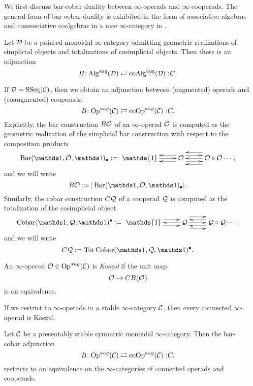 We first discuss bar-cobar duality between $\infty$-operads and $\infty$-cooperads. The general form of bar-cobar duality is exhibited in the form of associative algebras and coassociative coalgebras in a nice $\infty$-category in \cite{HA}.
\begin{proposition}
\cite[Remark 5.2.2.19.]{HA}
Let ${\mathcal{D}}$ be a pointed monoidal $\infty$-category admitting geometric realizations of simplicial objects and totalizations of cosimplicial objects. Then there is an adjunction
\[
B\negmedspace: \operatorname{Alg}^{\operatorname{aug}} ({\mathcal{D}})\rightleftarrows \operatorname{coAlg}^{\operatorname{aug}}({\mathcal{D}}):\negmedspace C.
\]
\end{proposition}
If ${\mathcal{D}}= \operatorname{SSeq}({\mathcal{C}})$, then we obtain an adjunction between (augmented) operads and (coaugmented) cooperads.
	$$
	B\negmedspace: \operatorname{Op}^{aug}({\mathcal{C}})\rightleftarrows \operatorname{coOp}^{aug}({\mathcal{C}}):\negmedspace C.
	$$
Explicitly, the bar construction $B{\mathcal{O}}$ of an $\infty$-operad ${\mathcal{O}}$ is computed as the geometric realization of the simplicial bar construction with respect to the composition products \cite[Section 4.4.2]{HA}
	\[
		\Barconstruction(\triv, \CO, \triv)_{\bullet}:=\xymatrix{ \mathds{1}\ar@<0ex>[r]  &  
		\CO \ar@<1ex>[r] \ar@<-1ex>[r] \ar@<1ex>[l] \ar@<-1ex>[l]  &  \CO\circ \CO \ar@<2ex>[l] \ar@<0ex>[l] \ar@<-2ex>[l] \cdots},
\]
and we will write 
$$
B\CO := |\Barconstruction(\triv, \CO, \triv)_{\bullet}|.
$$
	Similarly, the cobar construction $C{\mathcal{Q}}$ of a cooperad ${\mathcal{Q}}$ is computed as the totalization of the cosimplicial object
	\[
		\Cobar(\triv, \CQ, \triv)^{\bullet}:=\xymatrix{ \mathds{1} \ar@<1ex>[r] \ar@<-1ex>[r] &  
		\CQ \ar@<0ex>[l] \ar@<2ex>[r] \ar@<0ex>[r] \ar@<-2ex>[r] & \CQ\circ \CQ \ar@<1ex>[l] \ar@<-1ex>[l] \cdots}.
\]
and we will write 
$$
C\CQ := \Tot \Cobar(\triv, \CQ, \triv)^{\bullet}.
$$



\begin{definition}
	An $\infty$-operad ${\mathcal{O}}\in \operatorname{Op}^{aug}({\mathcal{C}})$ is \emph{Koszul} if the unit map
	$$
	{\mathcal{O}}\rightarrow CB({\mathcal{O}})
	$$
	is an equivalence.
\end{definition}

If we restrict to $\infty$-operads in a stable $\infty$-category ${\mathcal{C}}$, then every connected $\infty$-operad is Koszul.

\begin{proposition}
\cite[Proposition 3.4]{Heuts_Koszul}
\label{Connected operads are Koszul}
Let ${\mathcal{C}}$ be a presentably stable symmtric monoidal $\infty$-category. Then the bar-cobar adjunction
	$$
	B\negmedspace: \operatorname{Op}^{aug}({\mathcal{C}})\rightleftarrows \operatorname{coOp}^{aug}({\mathcal{C}}):\negmedspace C.
	$$
	restricts to an equivalence on the  $\infty$-categories of connected operads and cooperads.
\end{proposition}



